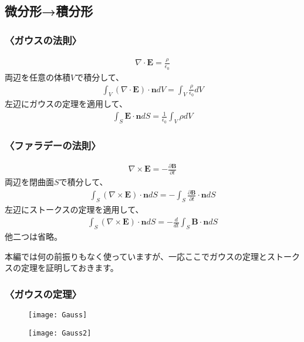 \documentclass[10pt,b5paper,papersize,dvipdfmx]{jsbook}
\begin{document}
\subsection{微分形→積分形}
\subsubsection{〈ガウスの法則〉}
\begin{align}
\nabla\cdot\mathbf{E} = \frac{\rho}{\epsilon_0}
\end{align}
両辺を任意の体積$V$で積分して、
\begin{align}
\int_V (\nabla\cdot\mathbf{E})\cdot\mathbf{n}dV=\int_V \frac{\rho}{\epsilon_0}dV
\end{align}
左辺にガウスの定理を適用して、
\begin{align}
\int_S \mathbf{E}\cdot \mathbf{n} dS = \frac{1}{\epsilon_0} \int_V \rho dV
\end{align}

\subsubsection{〈ファラデーの法則〉}
\begin{align}
\nabla\times\mathbf{E} = -\frac{\partial\mathbf{B}}{\partial t}
\end{align}
両辺を閉曲面$S$で積分して、
\begin{align}
\int_S (\nabla\times\mathbf{E})\cdot\mathbf{n}dS = -\int_S \frac{\partial\mathbf{B}}{\partial t}\cdot\mathbf{n}dS
\end{align}
左辺にストークスの定理を適用して、
\begin{align}
\int_S (\nabla\times\mathbf{E})\cdot\mathbf{n} dS = -\frac{d}{dt}\int_S \mathbf{B}\cdot \mathbf{n} dS
\end{align}
他二つは省略。
\par
\par
本編では何の前振りもなく使っていますが、一応ここでガウスの定理とストークスの定理を証明しておきます。
\subsubsection{〈ガウスの定理〉}
\begin{figure}[htbp]
  \begin{flushright}
  \texttt{[image: Gauss]}
  \end{flushright}
\end{figure}

\begin{figure}[htbp]
  \begin{flushright}
  \texttt{[image: Gauss2]}
  \end{flushright}
\end{figure}
\end{document}
